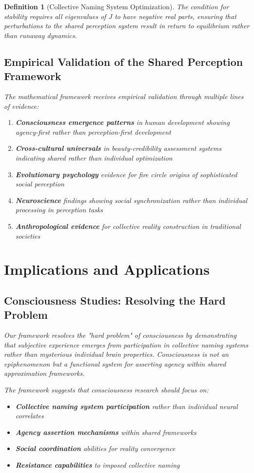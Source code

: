 \documentclass[12pt]{article}
\newtheorem{definition}{Definition}
\begin{document}
\begin{definition}[Collective Naming System Optimization]
The condition for stability requires all eigenvalues of $J$ to have negative real parts, ensuring that perturbations to the shared perception system result in return to equilibrium rather than runaway dynamics.

\subsection{Empirical Validation of the Shared Perception Framework}

The mathematical framework receives empirical validation through multiple lines of evidence:

\begin{enumerate}
\item \textbf{Consciousness emergence patterns} in human development showing agency-first rather than perception-first development
\item \textbf{Cross-cultural universals} in beauty-credibility assessment systems indicating shared rather than individual optimization
\item \textbf{Evolutionary psychology} evidence for fire circle origins of sophisticated social perception
\item \textbf{Neuroscience} findings showing social synchronization rather than individual processing in perception tasks
\item \textbf{Anthropological evidence} for collective reality construction in traditional societies
\end{enumerate}

\section{Implications and Applications}

\subsection{Consciousness Studies: Resolving the Hard Problem}

Our framework resolves the "hard problem" of consciousness by demonstrating that subjective experience emerges from participation in collective naming systems rather than mysterious individual brain properties. Consciousness is not an epiphenomenon but a functional system for asserting agency within shared approximation frameworks.

The framework suggests that consciousness research should focus on:
\begin{itemize}
\item \textbf{Collective naming system participation} rather than individual neural correlates
\item \textbf{Agency assertion mechanisms} within shared frameworks
\item \textbf{Social coordination} abilities for reality convergence
\item \textbf{Resistance capabilities} to imposed collective naming
\end{itemize}


\end{definition}
\end{document}
